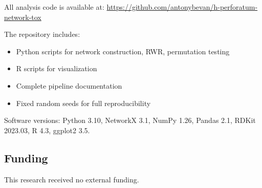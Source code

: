 All analysis code is available at:
\url{https://github.com/antonybevan/h-perforatum-network-tox}

The repository includes:
\begin{itemize}
    \item Python scripts for network construction, RWR, permutation testing
    \item R scripts for visualization
    \item Complete pipeline documentation
    \item Fixed random seeds for full reproducibility
\end{itemize}

Software versions: Python 3.10, NetworkX 3.1, NumPy 1.26, Pandas 2.1, RDKit 2023.03, R 4.3, ggplot2 3.5.

\subsection*{Funding}

This research received no external funding.
